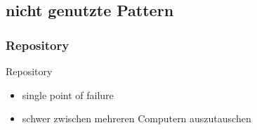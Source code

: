 \documentclass{beamer}
\begin{document}
		
		\subsection{nicht genutzte Pattern}
		
%					
%				
%				
%		
%				
		
		\subsubsection{Repository}
		\begin{frame}{Repository}
			\begin{itemize}
				\item single point of failure
				\item schwer zwischen mehreren Computern auszutauschen%
				
			\end{itemize}
		\end{frame}
		
\end{document}
